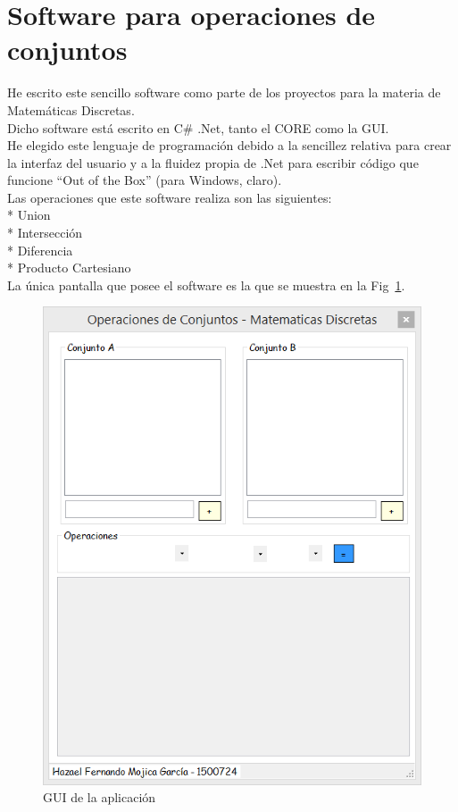 \section{Software para operaciones de conjuntos}

He escrito este sencillo software como parte de los proyectos para la materia de Matemáticas Discretas.\\

Dicho software está escrito en C\# .Net, tanto el CORE como la GUI.\\

He elegido este lenguaje de programación debido a la sencillez relativa para crear la interfaz del usuario y a la fluidez propia de .Net para escribir código que funcione ``Out of the Box'' (para Windows, claro).\\

Las operaciones que este software realiza son las siguientes:\\
* Union\\
* Intersección\\
* Diferencia\\
* Producto Cartesiano\\

La única pantalla que posee el software es la que se muestra en la Fig~\ref{img:1}.\\


\begin{figure}[h]
\centering
    \includegraphics[angle = 0]{img/1.png}
    \caption{GUI de la aplicación}
	\label{img:1}
\end{figure}

